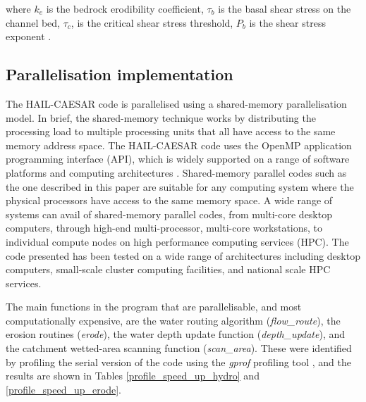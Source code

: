 \noindent
where \(k_e\) is the bedrock erodibility coefficient, \(\tau_b\) is the basal shear stress on the channel bed, \(\tau_c\), is the critical shear stress threshold, \(P_b\) is the shear stress exponent \citep{howard1983channel,whipple1999dynamics}.

\subsection{Parallelisation implementation}
The HAIL-CAESAR code is parallelised using a shared-memory parallelisation model. In brief, the shared-memory technique works by distributing the processing load to multiple processing units that all have access to the same memory address space. The HAIL-CAESAR code uses the OpenMP application programming interface (API), which is widely supported on a range of software platforms and computing architectures \citep{dagum1998openmp}. Shared-memory parallel codes such as the one described in this paper are suitable for any computing system where the physical processors have access to the same memory space. A wide range of systems can avail of shared-memory parallel codes, from multi-core desktop computers, through high-end multi-processor, multi-core workstations, to individual compute nodes on high performance computing services (HPC). The code presented has been tested on a wide range of architectures including desktop computers,  small-scale cluster computing facilities, and national scale HPC services.

The main functions in the program that are parallelisable, and most computationally expensive, are the water routing algorithm (\textit{flow\_route}), the erosion routines (\textit{erode}), the water depth update function (\textit{depth\_update}), and the catchment wetted-area scanning function (\textit{scan\_area}). These were identified by profiling the serial version of the code using the \textit{gprof} profiling tool \citep{graham1982gprof}, and the results are shown in Tables \ref{profile_speed_up_hydro} and \ref{profile_speed_up_erode}.

